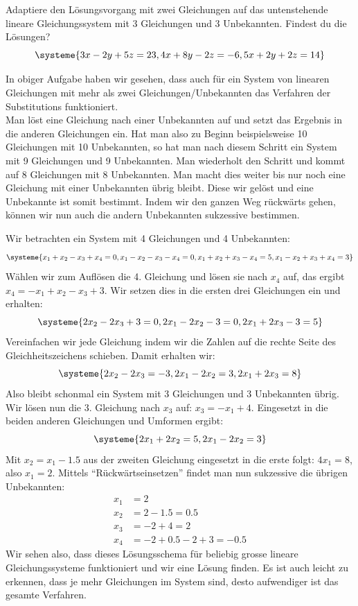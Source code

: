 \documentclass[11pt,oneside]{article}
\begin{document}
\begin{aufgabe}
	Adaptiere den Lösungsvorgang mit zwei Gleichungen auf das untenstehende lineare Gleichungssystem mit 3 Gleichungen und 3 Unbekannten. Findest du die Lösungen?
	\begin{equation*}
		\systeme{3x-2y+5z=23, 4x+8y-2z=-6, 5x+2y+2z=14}
	\end{equation*}
\end{aufgabe}
In obiger Aufgabe haben wir gesehen, dass auch für ein System von linearen Gleichungen mit mehr als zwei Gleichungen/Unbekannten das Verfahren der Substitutions funktioniert.\\
Man löst eine Gleichung nach einer Unbekannten auf und setzt das Ergebnis in die anderen Gleichungen ein. Hat man also zu Beginn beispielsweise 10 Gleichungen mit 10 Unbekannten, so hat man nach diesem Schritt ein System mit 9 Gleichungen und 9 Unbekannten. Man wiederholt den Schritt und kommt auf 8 Gleichungen mit 8 Unbekannten. Man macht dies weiter bis nur noch eine Gleichung mit einer Unbekannten übrig bleibt. Diese wir gelöst und eine Unbekannte ist somit bestimmt. Indem wir den ganzen Weg rückwärts gehen, können wir nun auch die andern Unbekannten sukzessive bestimmen.
\begin{beispiel}
	Wir betrachten ein System mit 4 Gleichungen und 4 Unbekannten:
	\begin{equation*}
		\systeme{x_1+x_2-x_3+x_4=0, x_1-x_2-x_3-x_4=0, x_1+x_2+x_3-x_4=5, x_1-x_2+x_3+x_4=3}
	\end{equation*}
	Wählen wir zum Auflösen die 4. Gleichung und lösen sie nach $x_4$ auf, das ergibt $x_4=-x_1+x_2-x_3+3$. Wir setzen dies in die ersten drei Gleichungen ein und erhalten:
	\begin{equation*}
		\systeme{2x_2-2x_3+3=0, 2x_1-2x_2-3=0, 2x_1+2x_3-3=5}
	\end{equation*}
	Vereinfachen wir jede Gleichung indem wir die Zahlen auf die rechte Seite des Gleichheitszeichens schieben. Damit erhalten wir:
	\begin{equation*}
		\systeme{2x_2-2x_3=-3, 2x_1-2x_2=3, 2x_1+2x_3=8}
	\end{equation*}
	Also bleibt schonmal ein System mit 3 Gleichungen und 3 Unbekannten übrig. Wir lösen nun die 3. Gleichung nach $x_3$ auf: $x_3=-x_1+4$. Eingesetzt in die beiden anderen Gleichungen und Umformen ergibt:
	\begin{equation*}
		\systeme{2x_1+2x_2=5, 2x_1-2x_2=3}
	\end{equation*}
	Mit $x_2=x_1-1.5$ aus der zweiten Gleichung eingesetzt in die erste folgt: $4x_1=8$, also $x_1=2$. Mittels "`Rückwärtseinsetzen"' findet man nun sukzessive die übrigen Unbekannten:
	\begin{align*}
		x_1&=2\\
		x_2&=2-1.5=0.5\\
		x_3&=-2+4=2\\
		x_4&=-2+0.5-2+3=-0.5
	\end{align*}
	Wir sehen also, dass dieses Lösungsschema für beliebig grosse lineare Gleichungssysteme funktioniert und wir eine Lösung finden. Es ist auch leicht zu erkennen, dass je mehr Gleichungen im System sind, desto aufwendiger ist das gesamte Verfahren.
\end{beispiel}
\end{document}
